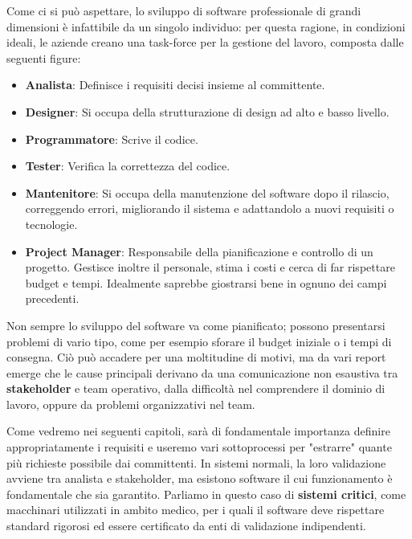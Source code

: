 \noindent Come ci si può aspettare, lo sviluppo di software professionale di grandi dimensioni è infattibile da un singolo individuo: per questa ragione, in condizioni ideali, le aziende creano una task-force per la gestione del lavoro, composta dalle seguenti figure: \begin{itemize}
	\item \textbf{Analista}: Definisce i requisiti decisi insieme al committente.
	\item \textbf{Designer}: Si occupa della strutturazione di design ad alto e basso livello.
	\item \textbf{Programmatore}: Scrive il codice.
	\item \textbf{Tester}: Verifica la correttezza del codice.
	\item \textbf{Mantenitore}: Si occupa della manutenzione del software dopo il rilascio, correggendo errori, migliorando il sistema e adattandolo a nuovi requisiti o tecnologie.
	\item \textbf{Project Manager}: Responsabile della pianificazione e controllo di un progetto. Gestisce inoltre il personale, stima i costi e cerca di far rispettare budget e tempi. Idealmente saprebbe giostrarsi bene in ognuno dei campi precedenti.
\end{itemize}
\noindent Non sempre lo sviluppo del software va come pianificato; possono presentarsi problemi di vario tipo, come per esempio sforare il budget iniziale o i tempi di consegna. Ciò può accadere per una moltitudine di motivi, ma da vari report emerge che le cause principali derivano da una comunicazione non esaustiva tra \textbf{stakeholder} e team operativo, dalla difficoltà nel comprendere il dominio di lavoro, oppure da problemi organizzativi nel team.\par
Come vedremo nei seguenti capitoli, sarà di fondamentale importanza definire appropriatamente i requisiti e useremo vari sottoprocessi per "estrarre" quante più richieste possibile dai committenti. In sistemi normali, la loro validazione avviene tra analista e stakeholder, ma esistono software il cui funzionamento è fondamentale che sia garantito. Parliamo in questo caso di \textbf{sistemi critici}, come macchinari utilizzati in ambito medico, per i quali il software deve rispettare standard rigorosi ed essere certificato da enti di validazione indipendenti.